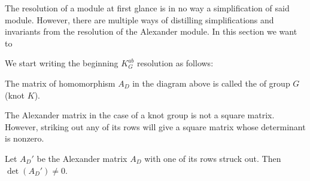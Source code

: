 The resolution of a module at first glance is in no way a simplification of said module. However, there are multiple ways of distilling simplifications and invariants from the resolution of the Alexander module. {\color{purple}In this section we want to }

We start writing the beginning $K_G^{ab}$ resolution as follows:
\begin{center}
\end{center}


\begin{definition}
  The matrix of homomorphism $A_D$ in the diagram above is called the  of group $G$ (knot $K$).
\end{definition}

The Alexander matrix in the case of a knot group is not a square matrix. However, striking out any of its rows will give a square matrix whose determinant is nonzero.

\begin{proposition}\label{alexander matrix has trivial kernel}
  Let $A_D'$ be the Alexander matrix $A_D$ with one of its rows struck out. Then $\det(A_D')\neq 0$.
\end{proposition}

